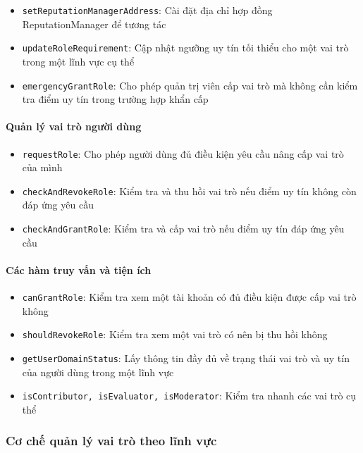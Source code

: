 \begin{itemize}
  \item \texttt{setReputationManagerAddress}: Cài đặt địa chỉ hợp đồng ReputationManager để tương tác
  \item \texttt{updateRoleRequirement}: Cập nhật ngưỡng uy tín tối thiểu cho một vai trò trong một lĩnh vực cụ thể
  \item \texttt{emergencyGrantRole}: Cho phép quản trị viên cấp vai trò mà không cần kiểm tra điểm uy tín trong trường hợp khẩn cấp
\end{itemize}

\paragraph{Quản lý vai trò người dùng}

\begin{itemize}
  \item \texttt{requestRole}: Cho phép người dùng đủ điều kiện yêu cầu nâng cấp vai trò của mình
  \item \texttt{checkAndRevokeRole}: Kiểm tra và thu hồi vai trò nếu điểm uy tín không còn đáp ứng yêu cầu
  \item \texttt{checkAndGrantRole}: Kiểm tra và cấp vai trò nếu điểm uy tín đáp ứng yêu cầu
\end{itemize}

\paragraph{Các hàm truy vấn và tiện ích}

\begin{itemize}
  \item \texttt{canGrantRole}: Kiểm tra xem một tài khoản có đủ điều kiện được cấp vai trò không
  \item \texttt{shouldRevokeRole}: Kiểm tra xem một vai trò có nên bị thu hồi không
  \item \texttt{getUserDomainStatus}: Lấy thông tin đầy đủ về trạng thái vai trò và uy tín của người dùng trong một lĩnh vực
  \item \texttt{isContributor, isEvaluator, isModerator}: Kiểm tra nhanh các vai trò cụ thể
\end{itemize}

\subsubsection{Cơ chế quản lý vai trò theo lĩnh vực}

